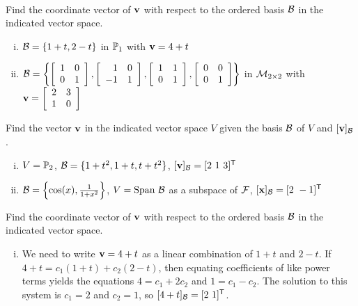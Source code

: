 
\ExampleIntro

\begin{example} ~
	\ba
	\item Find the coordinate vector of $\mathbf{v}$ with respect to the ordered basis $\mathcal{B}$ in the indicated vector space.
		\begin{enumerate}[i.]
		\item $\mathcal{B} = \{1+t, 2-t\}$ in $\mathbb{P}_1$ with $\mathbf{v} = 4+t$
	
		\item $\mathcal{B} = \left\{ \left[ \begin{array}{cc} 1&0\\0&1 \end{array} \right],  \left[ \begin{array}{rc} 1&0\\-1&1 \end{array} \right], \left[ \begin{array}{cc} 1&1\\0&1 \end{array} \right], \left[ \begin{array}{cc} 0&0\\0&1 \end{array} \right] \right\}$ in $\mathcal{M}_{2 \times 2}$ with $\mathbf{v} = \left[ \begin{array}{cc} 2&3\\1&0 \end{array} \right]$
		\end{enumerate}
	
	\item Find the vector $\mathbf{v}$ in the indicated vector space $V$ given the basis $\mathcal{B}$ of $V$ and $[\mathbf{v}]_{\mathcal{B}}$.
		\begin{enumerate}[i.]
		\item $V = \mathbb{P}_2$, $\mathcal{B} = \{1+t^2, 1+t, t+t^2\}$, $[\mathbf{v}]_{\mathcal{B}} = [2 \ 1 \ 3]^{\mathsf{T}}$
		
		\item $\mathcal{B} = \left\{\cos(x), \frac{1}{1+x^2}\right\}$, $V = \Span \ \CB$ as a subspace of $\mathcal{F}$, $[\mathbf{x}]_{\mathcal{B}} = [2 \ -1]^{\mathsf{T}}$
		
		\end{enumerate}
	
	\ea

\ExampleSolution

	\ba
	\item Find the coordinate vector of $\mathbf{v}$ with respect to the ordered basis $\mathcal{B}$ in the indicated vector space.
		\begin{enumerate}[i.]
		\item We need to write $\mathbf{v} =4+t$ as a linear combination of $1+t$ and $2-t$. If $4+t = c_1(1+t) + c_2(2-t)$, then equating coefficients of like power terms yields the equations $4 = c_1 +2c_2$ and $1 = c_1-c_2$. The solution to this system is $c_1 = 2$ and $c_2 = 1$, so $[4+t]_{\CB} = [2 \ 1]^{\tr}$.  
		

\end{enumerate}
\end{example}

